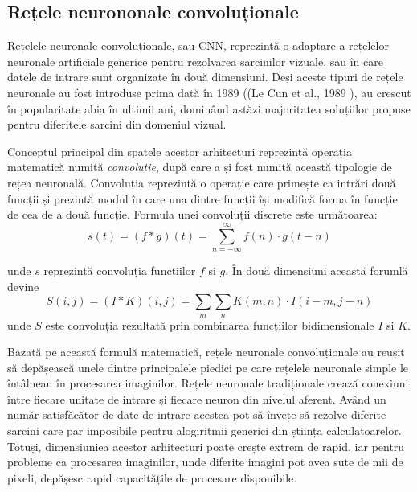 \documentclass[a4paper,12pt]{book}
\begin{document}
			\subsection{Rețele neurononale convoluționale} \label{cnns}
				Rețelele neuronale convoluționale, sau CNN, reprezintă o adaptare a rețelelor neuronale artificiale generice pentru rezolvarea sarcinilor vizuale, sau în care datele de intrare sunt organizate în două dimensiuni. Deși aceste tipuri de rețele neuronale au fost introduse prima dată în 1989 ((Le Cun et al., 1989 \cite{leCun}), au crescut în popularitate abia în ultimii ani, dominând astăzi majoritatea soluțiilor propuse pentru diferitele sarcini din domeniul vizual. \par 
				Conceptul principal din spatele acestor arhitecturi reprezintă operația matematică numită \textit{convoluție}, după care a și fost numită această tipologie de rețea neuronală. Convoluția reprezintă o operație care primește ca intrări două funcții și prezintă modul în care una dintre funcții își modifică forma în funcție de cea de a două funcție. Formula unei convoluții discrete este următoarea:
				\begin{equation*}
					s(t) = (f*g)(t) = \sum_{n=-\infty}^{\infty} f(n) \cdot g(t - n)
				\end{equation*}	\par
				unde $s$ reprezintă convoluția funcțiilor $f$ si $g$.
				\noindent În două dimensiuni această forumlă devine
				\begin{equation}\label{convo}				
					S(i, j) = (I*K)(i, j) = \sum_{m} \sum_{n} K(m, n) \cdot I(i - m, j - n)
				\end{equation}
				unde $S$ este convoluția rezultată prin combinarea funcțiilor bidimensionale $I$ si $K$.\par
				Bazată pe această formulă matematică, rețele neuronale convoluționale au reușit să depășească unele dintre principalele piedici pe care rețelele neuronale simple le întâlneau în procesarea imaginilor. Rețele neuronale tradiționale crează conexiuni între fiecare unitate de intrare și fiecare neuron din nivelul aferent. Având un număr satisfăcător de date de intrare acestea pot să învețe să rezolve diferite sarcini care par imposibile pentru alogiritmii generici din știința calculatoarelor. Totuși, dimensiuniea acestor arhitecturi poate crește extrem de rapid, iar pentru probleme ca procesarea imaginilor, unde diferite imagini pot avea sute de mii de pixeli, depășesc rapid capacitățile de procesare disponibile. \par
				
\end{document}

